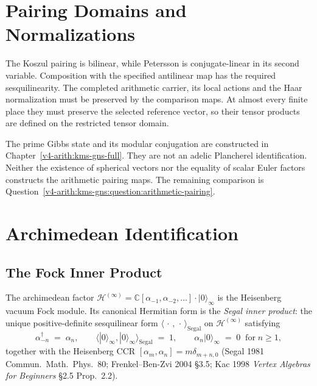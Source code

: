 \section{Pairing Domains and Normalizations}
\label{v4-arith:kp:obstruction-analysis-table}

The Koszul pairing is bilinear, while Petersson is conjugate-linear
in its second variable. Composition with the specified antilinear
map has the required sesquilinearity. The completed arithmetic
carrier, its local actions and the Haar normalization must be
preserved by the comparison maps. At almost every finite place
they must preserve the selected reference vector, so their tensor
products are defined on the restricted tensor domain.

The prime Gibbs state and its modular conjugation are constructed
in Chapter~\ref{v4-arith:kms-gns-full}. They are not an adelic
Plancherel identification. Neither the existence of spherical
vectors nor the equality of scalar Euler factors constructs the
arithmetic pairing maps. The remaining comparison is
Question~\ref{v4-arith:kms-gns:question:arithmetic-pairing}.

\section{Archimedean Identification}
\label{v4-arith:kp:arch}

\subsection{The Fock Inner Product}
\label{v4-arith:kp:arch:Fock}

The archimedean factor
\(\mathcal{H}^{(\infty)}=\mathbb{C}[\alpha_{-1},\alpha_{-2},\ldots]\cdot|0\rangle_{\infty}\)
is the Heisenberg vacuum Fock module. Its canonical Hermitian
form is the \emph{Segal inner product}: the unique
positive-definite sesquilinear form \(\langle\,\cdot\,,\,\cdot\,\rangle_{\mathrm{Segal}}\)
on \(\mathcal{H}^{(\infty)}\) satisfying
\begin{equation}
\label{v4-arith:kp:eq:Segal-normalisation}
\alpha_{-n}^{\dagger}\;=\;\alpha_{n},
\qquad
\langle |0\rangle_{\infty},|0\rangle_{\infty}\rangle_{\mathrm{Segal}}\;=\;1,
\qquad
\alpha_{n}|0\rangle_{\infty}\;=\;0\;\;\text{for}\;n\geq 1,
\end{equation}
together with the Heisenberg CCR
\([\alpha_{m},\alpha_{n}]=m\delta_{m+n,0}\) (Segal 1981
Commun.~Math.~Phys.~80; Frenkel--Ben-Zvi 2004 \S3.5; Kac 1998
\emph{Vertex Algebras for Beginners} \S2.5 Prop.~2.2).

